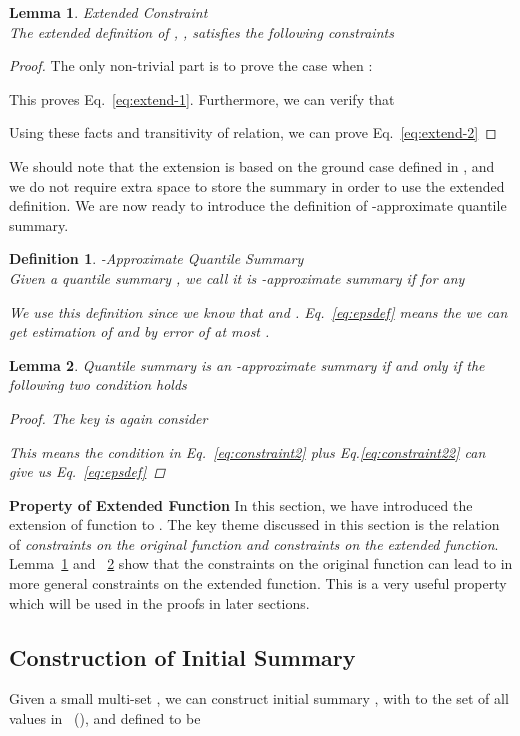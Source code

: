 \documentclass{sig-alternate-05-2015}
\newtheorem{thm:def}{Definition}[section]
\newtheorem{thm:lemma}{Lemma}[section]
\begin{document}
\begin{thm:lemma}\label{lem:ext-constraint}{Extended Constraint}\\
The extended definition of , ,  satisfies the following constraints


\end{thm:lemma}
\begin{proof}
The only non-trivial part is to prove the case when :


This proves Eq.~\eqref{eq:extend-1}.
Furthermore, we can verify that



Using these facts and transitivity of  relation, we can prove Eq.~\eqref{eq:extend-2}
\end{proof}
We should note that the extension is based on the ground case defined in , and we do not require extra space to store the summary in order to use the extended definition. We are now ready to introduce the definition of -approximate quantile summary.
\begin{thm:def}{-Approximate Quantile Summary}\\
Given a quantile summary , we call it is -approximate summary if for any 

We use this definition since we know that  and . Eq.~\eqref{eq:epsdef} means the we can get estimation of  and  by error of at most .
\end{thm:def}
\begin{thm:lemma}\label{lemma:eps}
Quantile summary  is an -approximate summary if and only if the following two condition holds


\begin{proof}
The key is again consider 

This means the condition in Eq.~\eqref{eq:constraint2} plus Eq.\eqref{eq:constraint22} can give us Eq.~\eqref{eq:epsdef}
\end{proof}
\end{thm:lemma}

\noindent \textbf{Property of Extended Function} In this section, we have introduced the extension of function  to .
The key theme discussed in this section is the relation of \emph{constraints on the original function and constraints on the extended function}.
Lemma~\ref{lem:ext-constraint} and ~\ref{lemma:eps} show that the constraints on the original function can lead to in more general constraints on the extended function.
This is a very useful property which will be used in the proofs in later sections.

\subsection{Construction of Initial Summary}
Given a small multi-set , we can construct initial summary , with  to the set of all values in ~(), and  defined to be
\end{document}
